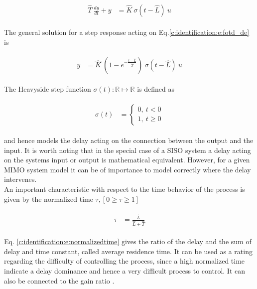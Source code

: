 \begin{align}
\begin{split}
\hat{T}~\frac{dy}{dt} + y &= \hat{K} ~\sigma(t-\hat{L})~u
\end{split}
\label{c:identification:e:fotd_de}
\end{align}

The general solution for a step response acting on Eq.\ref{c:identification:e:fotd_de} is 

\begin{align}
\begin{split}
y &= \hat{K} ~\left( 1 - e^{-\frac{t- \hat{L}}{\hat{T}}}\right)~ \sigma(t-\hat{L}) ~u
\end{split}
\label{c:identification:e:fodt_dt}
\end{align}

The Heavyside step function $\sigma(t): \mathbb{R} \mapsto \mathbb{R}$ is defined as

\begin{align}
\begin{split}
\sigma(t) &= \begin{cases} 
      0 , ~t < 0 \\
      1, ~t \geq 0
   \end{cases}
\end{split}
\label{c:identificitaion:e:heavyside}
\end{align}

and hence models the delay acting on the connection between the output and the input. It is worth noting that in the special case of a SISO system a delay acting on the systems input or output is mathematical equivalent. However, for a given MIMO system model it can be of importance to model correctly where the delay intervenes. \\

An important characteristic with respect to the time behavior of the process is given by the normalized time $\tau, \left[0 \geq \tau \geq 1 \right] $ \cite[p.16]{Astrom1995}

\begin{align}
\begin{split}
\tau &= \frac{\hat{L}}{\hat{L}+\hat{T}}
\end{split}
\label{c:identification:e:normalizedtime}
\end{align}

Eq. \ref{c:identification:e:normalizedtime} gives the ratio of the delay and the sum of delay and time constant, called average residence time. It can be used as a rating regarding the difficulty of controlling the process, since a high normalized time indicate a delay dominance and hence a very difficult process to control. It can also be connected to the gain ratio \cite[p.27]{Astrom2006}.\\

